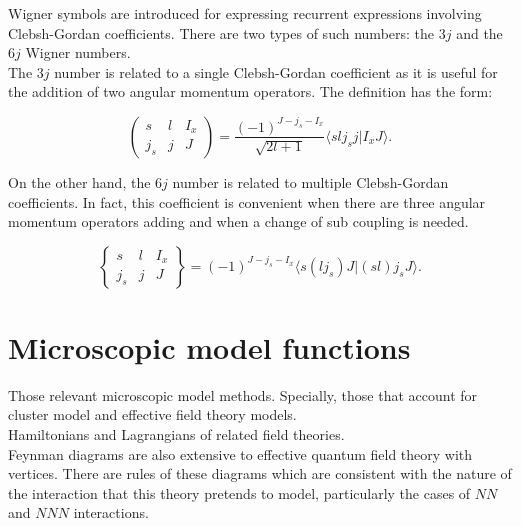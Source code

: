 \documentclass[openany]{book}
\begin{document}
Wigner symbols are introduced for expressing recurrent expressions involving Clebsh-Gordan coefficients. There are two types of such numbers: the $3j$ and the $6j$ Wigner numbers. \\

The $3j$ number is related to a single Clebsh-Gordan coefficient as it is useful for the addition of two angular momentum operators. The definition has the form: 

\begin{equation} \label{eq:angularMomentum_Wigner_3j}
	\left(\begin{array}{ccc}
		s &	l &	I_x \\
		j_s & j & J
	\end{array}\right) = \frac{(-1)^{J - j_s - I_x}}{\sqrt{2l +1}}  \langle sl j_s j | I_x J \rangle.
\end{equation}

On the other hand, the $6j$ number is related to multiple  Clebsh-Gordan coefficients. In fact, this coefficient is convenient when there are three angular momentum operators adding and when a change of sub coupling is needed.

\begin{equation}  \label{eq:angularMomentum_Wigner_6j}
	\left\{\begin{array}{ccc}
		s &	l &	I_x \\
		j_s & j & J
	\end{array}\right\} = (-1)^{J - j_s - I_x}  \langle s (l j_s) J | (s l) j_s J\rangle.
\end{equation}

\section{Microscopic model functions} \label{sec:microscopicalFunctions}

Those relevant microscopic model methods. Specially, those that account for cluster model and effective field theory models. \\

Hamiltonians and Lagrangians of related field theories. \\

Feynman diagrams are also extensive to effective quantum field theory with vertices. There are rules of these diagrams which are consistent with the nature of the interaction that this theory pretends to model, particularly the cases of $NN$ and $NNN$ interactions. \\
\end{document}
